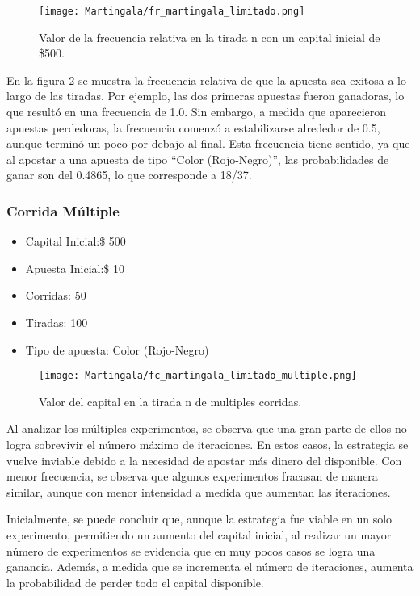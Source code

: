 \documentclass{article}
\begin{document}
\clearpage
\begin{figure} [h]
    \centering
    \texttt{[image: Martingala/fr\_martingala\_limitado.png]}
    \caption{Valor de la frecuencia relativa en la tirada n con un capital inicial de \$500.}
    \label{fig:grafico}
\end{figure}

En la figura 2 se muestra la frecuencia relativa de que la apuesta sea exitosa a lo largo de las tiradas. Por ejemplo, las dos primeras apuestas fueron ganadoras, lo que resultó en una frecuencia de 1.0. Sin embargo, a medida que aparecieron apuestas perdedoras, la frecuencia comenzó a estabilizarse alrededor de 0.5, aunque terminó un poco por debajo al final. Esta frecuencia tiene sentido, ya que al apostar a una apuesta de tipo ``Color (Rojo-Negro)'', las probabilidades de ganar son del 0.4865, lo que corresponde a 18/37.

\subsubsection{Corrida Múltiple}

\begin{itemize}
\item Capital Inicial:\$ 500
\item Apuesta Inicial:\$ 10
\item Corridas: 50
\item Tiradas: 100
\item Tipo de apuesta: Color (Rojo-Negro)
\end{itemize}

\begin{figure} [H]
        \centering

         \texttt{[image: Martingala/fc\_martingala\_limitado\_multiple.png]}
            \caption{Valor del capital en la tirada n de multiples corridas.}
            \label{fig:grafico}
             
    \end{figure}
    
Al analizar los múltiples experimentos, se observa que una gran parte de ellos no logra sobrevivir el número máximo de iteraciones. En estos casos, la estrategia se vuelve inviable debido a la necesidad de apostar más dinero del disponible. Con menor frecuencia, se observa que algunos experimentos fracasan de manera similar, aunque con menor intensidad a medida que aumentan las iteraciones.

Inicialmente, se puede concluir que, aunque la estrategia fue viable en un solo experimento, permitiendo un aumento del capital inicial, al realizar un mayor número de experimentos se evidencia que en muy pocos casos se logra una ganancia. Además, a medida que se incrementa el número de iteraciones, aumenta la probabilidad de perder todo el capital disponible.
\end{document}
